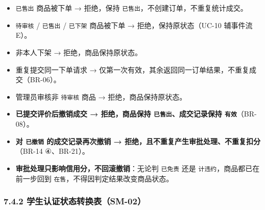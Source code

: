 \documentclass[12pt,a4paper]{ctexart}
\begin{document}
\begin{itemize}[leftmargin=1.6em,itemsep=1pt,topsep=2pt]
\item \texttt{已售出} 商品被下单 → 拒绝，保持 \texttt{已售出}，不创建订单，不重复统计成交。
\item \texttt{待审核} / \texttt{已售出} / \texttt{已下架} 商品被下单 → 拒绝，保持原状态（UC-10 辅事件流 E）。
\item 非本人下架 → 拒绝，商品保持原状态。
\item 重复提交同一下单请求 → 仅第一次有效，其余返回同一订单结果，不重复成交（BR-06）。
\item 管理员审核非 \texttt{待审核} 商品 → 拒绝，商品保持原状态。
\item \textbf{已提交评价后撤销成交 → 拒绝，商品保持 \texttt{已售出}、成交记录保持 \texttt{有效}}（BR-08）。
\item \textbf{对 \texttt{已撤销} 的成交记录再次撤销 → 拒绝，且不重复产生审批处理、不重复扣分}（BR-14 ④、BR-21）。
\item \textbf{审批处理只影响信用分，不回滚撤销}：无论判 \texttt{已免责} 还是 \texttt{计违约}，商品都已在前一步回到 \texttt{在售}，不得因判定结果改变商品状态。
\end{itemize}

\subsubsection*{7.4.2 学生认证状态转换表（SM-02）}
\end{document}
